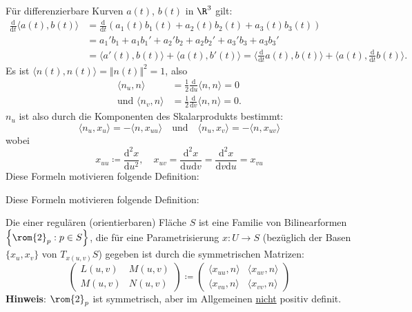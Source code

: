 \begin{remark}[Zwischenbemerkung]
  Für differenzierbare Kurven $ a(t) $, $ b(t) $ in $ \R^3 $ gilt:
  \begin{align*}
    \frac{\text{d}}{\text{d}t}\langle a(t), b(t) \rangle &= \frac{\text{d}}{\text{d}t}\left( a_1(t)b_1(t)+a_2(t)b_2(t)+a_3(t)b_3(t) \right) \\
     &= a_1'b_1+a_1b_1'+a_2'b_2+a_2b_2' + a_3'b_3+a_3b_3' \\
     &= \langle a'(t),b(t) \rangle + \langle a(t),b'(t) \rangle = \langle \frac{\text{d}}{\text{d} t}a(t),b(t) \rangle + \langle a(t), \frac{\text{d}}{\text{d}t}b(t) \rangle\text{.}
  \end{align*}
  Es ist $ \langle n(t),n(t) \rangle = \Vert n(t) \Vert^2 = 1 $, also
  \begin{align*}
    \langle n_u,n \rangle &= \frac{1}{2}\frac{\text{d}}{\text{d}u}\langle n,n \rangle = 0 \\
    \text{und } \langle n_v,n \rangle &= \frac{1}{2}\frac{\text{d}}{\text{d}v}\langle n,n \rangle = 0\text{.}
  \end{align*}
  $ n_u $ ist also durch die Komponenten des Skalarprodukts bestimmt:
  \begin{equation*}
    \langle n_u,x_u \rangle = -\langle n,x_{uu} \rangle \quad \text{und} \quad \langle n_u,x_v \rangle = - \langle n,x_{uv} \rangle
  \end{equation*}
  wobei
  \begin{equation*}
    x_{uu} \coloneqq \frac{\text{d}^2x}{\text{d}u^2}, \quad x_{uv}= \frac{\text{d}^2x}{\text{d}u\text{d}v} = \frac{\text{d}^2x}{\text{d}v\text{d}u} = x_{vu}
  \end{equation*}
  Diese Formeln motivieren folgende Definition:
\end{remark}

Diese Formeln motivieren folgende Definition:

\begin{definition}[2. Fundamentalform]
  Die \label{def:zweiteFundamentalform} einer regulären (orientierbaren) Fläche $ S $ ist eine Familie von Bilinearformen $ \left\{ \rom{2}_p : p \in S \right\} $, die für eine Parametrisierung $ x: U \to S $ (bezüglich der Basen $ \{ x_u, x_v \} $ von $ T_{x(u,v)}S $) gegeben ist durch die symmetrischen Matrizen:
  \begin{equation*}
    \begin{pmatrix}
      L(u,v) & M(u,v) \\
      M(u,v) & N(u,v)
    \end{pmatrix} \coloneqq \begin{pmatrix}
      \langle x_{uu},n \rangle & \langle x_{uv},n \rangle \\
      \langle x_{vu},n \rangle & \langle x_{vv},n \rangle
    \end{pmatrix}
  \end{equation*}
  \textbf{Hinweis}: $ \rom{2}_p $ ist symmetrisch, aber im Allgemeinen \underline{nicht} positiv definit.
\end{definition}

